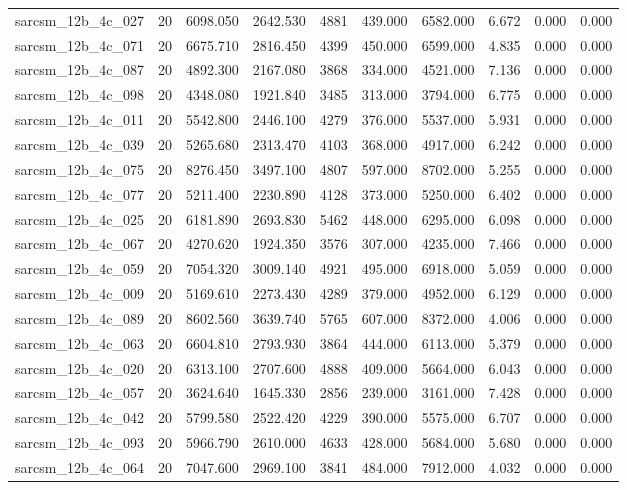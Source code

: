 \begin{tabular}{lrrrrrrrrr}
sarcsm\_12b\_4c\_027 & 20 & 6098.050 & 2642.530 & 4881 & 439.000 & 6582.000 & 6.672 & 0.000 & 0.000 \\
sarcsm\_12b\_4c\_071 & 20 & 6675.710 & 2816.450 & 4399 & 450.000 & 6599.000 & 4.835 & 0.000 & 0.000 \\
sarcsm\_12b\_4c\_087 & 20 & 4892.300 & 2167.080 & 3868 & 334.000 & 4521.000 & 7.136 & 0.000 & 0.000 \\
sarcsm\_12b\_4c\_098 & 20 & 4348.080 & 1921.840 & 3485 & 313.000 & 3794.000 & 6.775 & 0.000 & 0.000 \\
sarcsm\_12b\_4c\_011 & 20 & 5542.800 & 2446.100 & 4279 & 376.000 & 5537.000 & 5.931 & 0.000 & 0.000 \\
sarcsm\_12b\_4c\_039 & 20 & 5265.680 & 2313.470 & 4103 & 368.000 & 4917.000 & 6.242 & 0.000 & 0.000 \\
sarcsm\_12b\_4c\_075 & 20 & 8276.450 & 3497.100 & 4807 & 597.000 & 8702.000 & 5.255 & 0.000 & 0.000 \\
sarcsm\_12b\_4c\_077 & 20 & 5211.400 & 2230.890 & 4128 & 373.000 & 5250.000 & 6.402 & 0.000 & 0.000 \\
sarcsm\_12b\_4c\_025 & 20 & 6181.890 & 2693.830 & 5462 & 448.000 & 6295.000 & 6.098 & 0.000 & 0.000 \\
sarcsm\_12b\_4c\_067 & 20 & 4270.620 & 1924.350 & 3576 & 307.000 & 4235.000 & 7.466 & 0.000 & 0.000 \\
sarcsm\_12b\_4c\_059 & 20 & 7054.320 & 3009.140 & 4921 & 495.000 & 6918.000 & 5.059 & 0.000 & 0.000 \\
sarcsm\_12b\_4c\_009 & 20 & 5169.610 & 2273.430 & 4289 & 379.000 & 4952.000 & 6.129 & 0.000 & 0.000 \\
sarcsm\_12b\_4c\_089 & 20 & 8602.560 & 3639.740 & 5765 & 607.000 & 8372.000 & 4.006 & 0.000 & 0.000 \\
sarcsm\_12b\_4c\_063 & 20 & 6604.810 & 2793.930 & 3864 & 444.000 & 6113.000 & 5.379 & 0.000 & 0.000 \\
sarcsm\_12b\_4c\_020 & 20 & 6313.100 & 2707.600 & 4888 & 409.000 & 5664.000 & 6.043 & 0.000 & 0.000 \\
sarcsm\_12b\_4c\_057 & 20 & 3624.640 & 1645.330 & 2856 & 239.000 & 3161.000 & 7.428 & 0.000 & 0.000 \\
sarcsm\_12b\_4c\_042 & 20 & 5799.580 & 2522.420 & 4229 & 390.000 & 5575.000 & 6.707 & 0.000 & 0.000 \\
sarcsm\_12b\_4c\_093 & 20 & 5966.790 & 2610.000 & 4633 & 428.000 & 5684.000 & 5.680 & 0.000 & 0.000 \\
sarcsm\_12b\_4c\_064 & 20 & 7047.600 & 2969.100 & 3841 & 484.000 & 7912.000 & 4.032 & 0.000 & 0.000 \\

\end{tabular}
